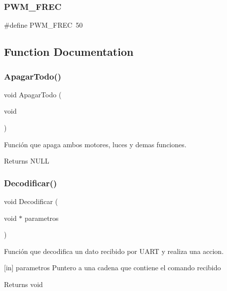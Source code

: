 \subsubsection{P\+W\+M\+\_\+\+F\+R\+EC}
{\footnotesize\ttfamily \#define P\+W\+M\+\_\+\+F\+R\+EC~50}



\subsection{Function Documentation}
\mbox{\label{group__ejemplos_ga3859cf6a567f2a26c80028a303810569}} 
\subsubsection{Apagar\+Todo()}
{\footnotesize\ttfamily void Apagar\+Todo (\begin{DoxyParamCaption}\item[{void}]{ }\end{DoxyParamCaption})}



Función que apaga ambos motores, luces y demas funciones. 

\begin{DoxyReturn}{Returns}
N\+U\+LL 
\end{DoxyReturn}
\mbox{\label{group__ejemplos_gac22bf435db08e863950a98080d747371}} 
\subsubsection{Decodificar()}
{\footnotesize\ttfamily void Decodificar (\begin{DoxyParamCaption}\item[{void $\ast$}]{parametros }\end{DoxyParamCaption})}



Función que decodifica un dato recibido por U\+A\+RT y realiza una accion. 

[in] parametros Puntero a una cadena que contiene el comando recibido \begin{DoxyReturn}{Returns}
void 
\end{DoxyReturn}
\mbox{\label{group__ejemplos_gaf74cc790a664df67891e450107e6af68}} 

